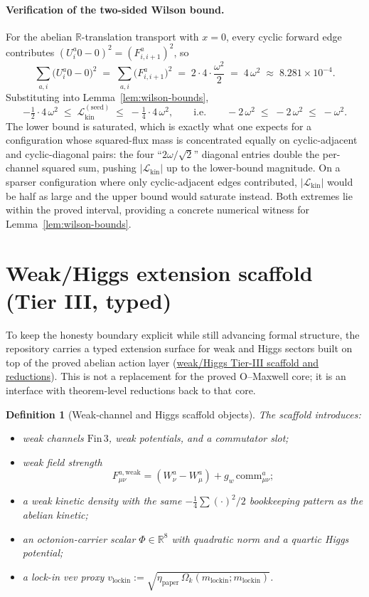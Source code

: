 \documentclass[11pt]{amsart}
\newtheorem{definition}[theorem]{Definition}
\begin{document}
\paragraph{Verification of the two-sided Wilson bound.}
For the abelian \(\mathbb{R}\)-translation transport with \(x=0\), every cyclic forward edge contributes \((U^a_i 0-0)^2=(F^a_{i,i+1})^2\), so
\[
\sum_{a,i}\bigl(U^a_i 0-0\bigr)^2 \;=\; \sum_{a,i}\bigl(F^a_{i,i+1}\bigr)^2 \;=\; 2\cdot 4\cdot\frac{\omega^2}{2} \;=\; 4\,\omega^2 \;\approx\;8.281\times 10^{-4}.
\]
Substituting into Lemma~\ref{lem:wilson-bounds},
\[
-\tfrac12\cdot 4\,\omega^2 \;\le\; \mathcal{L}_{\mathrm{kin}}^{(\mathrm{seed})} \;\le\; -\tfrac14\cdot 4\,\omega^2,
\qquad\text{i.e.}\qquad
-2\,\omega^2 \;\le\; -2\,\omega^2 \;\le\; -\omega^2 .
\]
The lower bound is saturated, which is exactly what one expects for a configuration whose squared-flux mass is concentrated equally on cyclic-adjacent and cyclic-diagonal pairs: the four ``\(2\omega/\sqrt{2}\)'' diagonal entries double the per-channel squared sum, pushing \(|\mathcal{L}_{\mathrm{kin}}|\) up to the lower-bound magnitude. On a sparser configuration where only cyclic-adjacent edges contributed, \(|\mathcal{L}_{\mathrm{kin}}|\) would be half as large and the upper bound would saturate instead. Both extremes lie within the proved interval, providing a concrete numerical witness for Lemma~\ref{lem:wilson-bounds}.

\section{Weak/Higgs extension scaffold (Tier III, typed)}
\label{sec:weak-higgs-scaffold}

To keep the honesty boundary explicit while still advancing formal structure, the repository carries a typed extension surface for weak and Higgs sectors built on top of the proved abelian action layer (\hyperref[lean:weakHiggs-scaffold]{weak/Higgs Tier-III scaffold and reductions}). This is not a replacement for the proved O--Maxwell core; it is an interface with theorem-level reductions back to that core.

\begin{definition}[Weak-channel and Higgs scaffold objects]
The scaffold introduces:
\begin{itemize}
\item weak channels \(\mathrm{Fin}\,3\), weak potentials, and a commutator slot;
\item weak field strength
\[
F^{a,\mathrm{weak}}_{\mu\nu}=(W^a_\nu-W^a_\mu)+g_w\,\mathrm{comm}^a_{\mu\nu};
\]
\item a weak kinetic density with the same \(-\tfrac14\sum(\cdot)^2/2\) bookkeeping pattern as the abelian kinetic;
\item an octonion-carrier scalar \(\Phi\in\mathbb{R}^8\) with quadratic norm and a quartic Higgs potential;
\item a lock-in vev proxy \(v_{\mathrm{lockin}}:=\sqrt{\eta_{\mathrm{paper}}\,\Omega_k(m_{\mathrm{lockin}};m_{\mathrm{lockin}})}\).
\end{itemize}
\end{definition}
\end{document}
